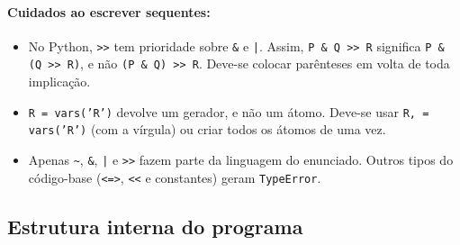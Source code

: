 \documentclass[12pt,a4paper]{article}
\begin{document}
\paragraph{Cuidados ao escrever sequentes:}
\begin{itemize}
    \item No Python, \texttt{>>} tem prioridade sobre \texttt{\&} e \texttt{|}. Assim, \texttt{P \& Q >> R} significa \texttt{P \& (Q >> R)}, e não \texttt{(P \& Q) >> R}. Deve-se colocar parênteses em volta de toda implicação.
    \item \texttt{R = vars('R')} devolve um gerador, e não um átomo. Deve-se usar \texttt{R, = vars('R')} (com a vírgula) ou criar todos os átomos de uma vez.
    \item Apenas \texttt{\textasciitilde}, \texttt{\&}, \texttt{|} e \texttt{>>} fazem parte da linguagem do enunciado. Outros tipos do código-base (\texttt{<=>}, \texttt{<<} e constantes) geram \texttt{TypeError}.
\end{itemize}

\subsection{Estrutura interna do programa}
\end{document}
